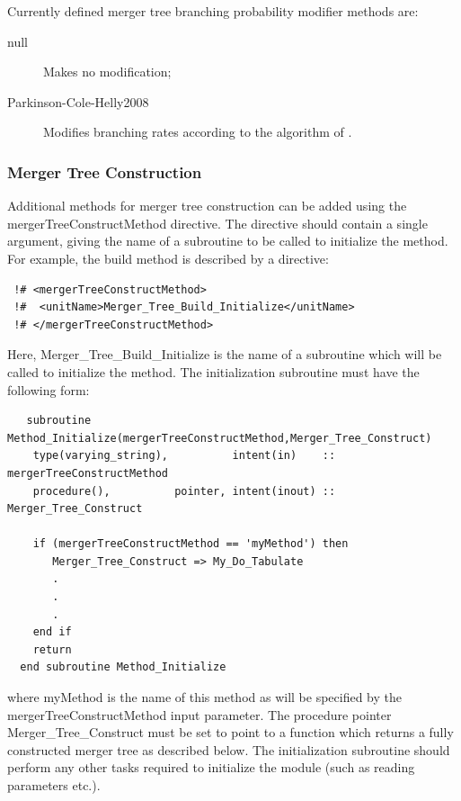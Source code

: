 Currently defined merger tree branching probability modifier methods are:
\begin{description}
 \item [{\normalfont \ttfamily null}] Makes no modification;
 \item [{\normalfont \ttfamily Parkinson-Cole-Helly2008}] Modifies branching rates according to the algorithm of \cite{parkinson_generating_2008}.
\end{description}

\subsubsection{Merger Tree Construction}\label{sec:MergerTreeConstruction}

Additional methods for merger tree construction can be added using the {\normalfont \ttfamily mergerTreeConstructMethod} directive. The directive should contain a single argument, giving the name of a subroutine to be called to initialize the method. For example, the {\normalfont \ttfamily build} method is described by a directive:
\begin{verbatim}
 !# <mergerTreeConstructMethod>
 !#  <unitName>Merger_Tree_Build_Initialize</unitName>
 !# </mergerTreeConstructMethod>
\end{verbatim}
Here, {\normalfont \ttfamily Merger\_Tree\_Build\_Initialize} is the name of a subroutine which will be called to initialize the method. The initialization subroutine must have the following form:
\begin{verbatim}
   subroutine Method_Initialize(mergerTreeConstructMethod,Merger_Tree_Construct)
    type(varying_string),          intent(in)    :: mergerTreeConstructMethod
    procedure(),          pointer, intent(inout) :: Merger_Tree_Construct
    
    if (mergerTreeConstructMethod == 'myMethod') then
       Merger_Tree_Construct => My_Do_Tabulate
       .
       .
       .
    end if
    return
  end subroutine Method_Initialize
\end{verbatim}
where {\normalfont \ttfamily myMethod} is the name of this method as will be specified by the {\normalfont \ttfamily mergerTreeConstructMethod} input parameter. The procedure pointer {\normalfont \ttfamily Merger\_Tree\_Construct} must be set to point to a function which returns a fully constructed merger tree as described below. The initialization subroutine should perform any other tasks required to initialize the module (such as reading parameters etc.).

